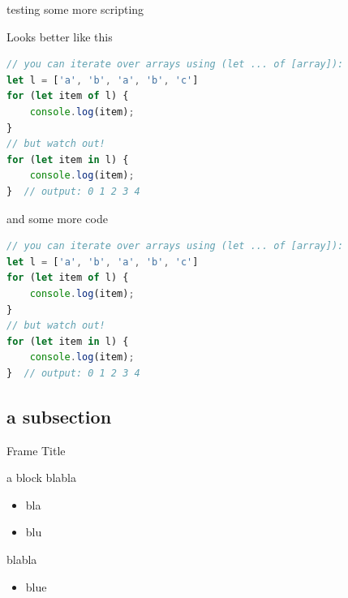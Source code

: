 \documentclass[notheorems, aspectratio=54, 14pt]{beamer}
\begin{document}
\begin{frame}[fragile]{testing some more scripting}

Looks better like this

    \begin{lstlisting}[language=JavaScript]
// you can iterate over arrays using (let ... of [array]):
let l = ['a', 'b', 'a', 'b', 'c']
for (let item of l) {
    console.log(item);
}
// but watch out!
for (let item in l) {
    console.log(item);
}  // output: 0 1 2 3 4 

\end{lstlisting}
    
\end{frame}

\begin{frame}[fragile]{and some more code}

\begin{parchment}
    \begin{lstlisting}[language=JavaScript]
// you can iterate over arrays using (let ... of [array]):
let l = ['a', 'b', 'a', 'b', 'c']
for (let item of l) {
    console.log(item);
}
// but watch out!
for (let item in l) {
    console.log(item);
}  // output: 0 1 2 3 4 
    \end{lstlisting}
\end{parchment}
    
\end{frame}

\subsection{a subsection}

\begin{frame}{Frame Title}
    

\begin{block}{a block}
    blabla

    \begin{itemize}
        \item bla
        \item[2.] blu
    \end{itemize}
\end{block}

\begin{parchment}
    blabla
    
\begin{itemize}
    \item blue

\end{itemize}    

\end{parchment}

\end{frame}
\end{document}
